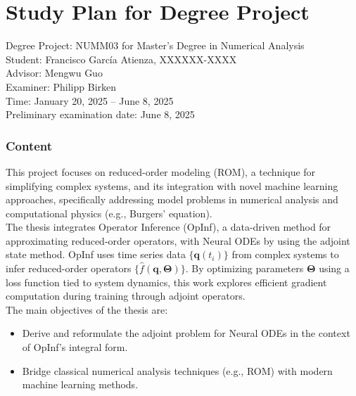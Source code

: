 \documentclass[en,cm,10pt]{inst}
\begin{document}
	\section*{Study Plan for Degree Project}
	Degree Project: NUMM03 for Master's Degree in Numerical Analysis \\
	Student: Francisco García Atienza, XXXXXX-XXXX\\
	Advisor: Mengwu Guo\\
	Examiner: Philipp Birken\\ 
	Time:  January 20, 2025 -- June 8, 2025\\
    Preliminary examination date: June 8, 2025
	
	\subsubsection*{Content}
	This project focuses on reduced-order modeling (ROM), a technique for simplifying complex systems, and its integration with novel machine learning approaches, specifically addressing model problems in numerical analysis and computational physics (e.g., Burgers' equation).\\
    
    \noindent The thesis integrates Operator Inference (OpInf), a data-driven method for approximating reduced-order operators, with Neural ODEs by using the adjoint state method. OpInf uses time series data $\{\mathbf{q}(t_i)\}$ from complex systems to infer reduced-order operators $\{\hat{f}(\mathbf{q}, \bm{\Theta})\}$. By optimizing parameters $\bm{\Theta}$ using a loss function tied to system dynamics, this work explores efficient gradient computation during training through adjoint operators.\\

    The main objectives of the thesis are:
    \begin{itemize}
        \item Derive and reformulate the adjoint problem for Neural ODEs in the context of OpInf's integral form.
        \item Bridge classical numerical analysis techniques (e.g., ROM) with modern machine learning methods.
    \end{itemize}
	
\end{document}
